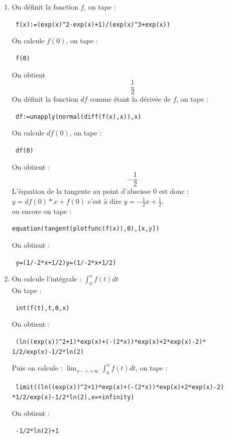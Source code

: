 \documentclass{article}
\begin{document}
\begin{enumerate}
\item 
On d\'efinit la fonction $f$, on tape :
\begin{center}
\verb| f(x):=(exp(x)^2-exp(x)+1)/(exp(x)^3+exp(x))|
\end{center}
On calcule $f(0)$, on tape :
\begin{center}
\verb| f(0)|
\end{center}
On obtient
$$\frac{1}{2}$$
On d\'efinit la fonction $df$ comme \'etant la d\'eriv\'ee de $f$, on tape :
\begin{center}
\verb| df:=unapply(normal(diff(f(x),x)),x)|
\end{center}
On calcule $df(0)$, on tape :
\begin{center}
\verb| df(0)|
\end{center}
On obtient :
$$-\frac{1}{2}$$
L'\'equation de la tangente au point d'abscisse $0$ est donc :\\
 $y=df(0)*x+f(0)$
c'est \`a dire $\displaystyle y=-\frac{1}{2}x+\frac{1}{2}$.\\
ou encore on tape :
\begin{center}
\verb|equation(tangent(plotfunc(f(x)),0),[x,y])|
\end{center}
On obtient :
\begin{center}
\verb| y=(1/-2*x+1/2)y=(1/-2*x+1/2)|
\end{center}

\item 
On calcule l'int\'egrale : $\displaystyle \int_0^x f(t)dt $\\
On tape :
\begin{center}
\verb| int(f(t),t,0,x)|
\end{center}
On obtient :
\begin{center}\verb| (ln((exp(x))^2+1)*exp(x)+(-(2*x))*exp(x)+2*exp(x)-2)*|
\verb| 1/2/exp(x)-1/2*ln(2)|\end{center}
Puis on calcule : $\displaystyle \lim_{x->+\infty}\int_0^x f(t)dt $, on tape :
\begin{center}
\verb| limit((ln((exp(x))^2+1)*exp(x)+(-(2*x))*exp(x)+2*exp(x)-2)|
\verb|*1/2/exp(x)-1/2*ln(2),x=+infinity)|
\end{center}
On obtient :
\begin{center}
\verb| -1/2*ln(2)+1|
\end{center}
\end{enumerate}
\end{document}
